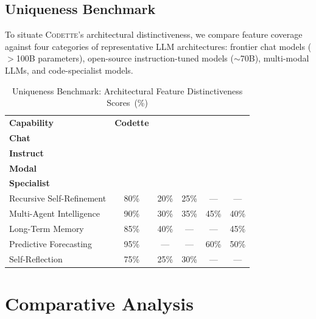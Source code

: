 \documentclass[11pt,a4paper]{article}
\newcommand{\codette}{\textsc{Codette}}
\begin{document}
\subsection{Uniqueness Benchmark}
\label{sec:uniqueness}

To situate \codette{}'s architectural distinctiveness, we compare feature coverage against four categories of representative LLM architectures: frontier chat models ($>$100B parameters), open-source instruction-tuned models (${\sim}$70B), multi-modal LLMs, and code-specialist models.

\begin{table}[H]
\centering
\caption{Uniqueness Benchmark: Architectural Feature Distinctiveness Scores~(\%)}
\label{tab:uniqueness}
\begin{tabular}{@{}lccccc@{}}
\toprule
\textbf{Capability} & \textbf{Codette} & \makecell{\textbf{Frontier}\\\textbf{Chat}} & \makecell{\textbf{Open-Src}\\\textbf{Instruct}} & \makecell{\textbf{Multi-}\\\textbf{Modal}} & \makecell{\textbf{Code}\\\textbf{Specialist}} \\
\midrule
Recursive Self-Refinement  & 80\% & 20\% & 25\% & ---  & --- \\
Multi-Agent Intelligence   & 90\% & 30\% & 35\% & 45\% & 40\% \\
Long-Term Memory           & 85\% & 40\% & ---  & ---  & 45\% \\
Predictive Forecasting     & 95\% & ---  & ---  & 60\% & 50\% \\
Self-Reflection            & 75\% & 25\% & 30\% & ---  & --- \\
\bottomrule
\end{tabular}
\end{table}

\section{Comparative Analysis}
\label{sec:comparative}
\end{document}
